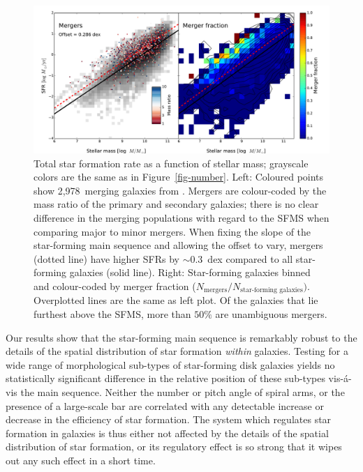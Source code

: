 \documentclass{emulateapj}
\begin{document}
\begin{figure}
\includegraphics[angle=0,width=7.0in]{figures/ms_mergers_both.pdf}
\caption{Total star formation rate as a function of stellar mass; grayscale colors are the same as in Figure~\ref{fig-number}. Left: Coloured points show 2,978~merging galaxies from \citet{dar10a}. Mergers are colour-coded by the mass ratio of the primary and secondary galaxies; there is no clear difference in the merging populations with regard to the SFMS when comparing major to minor mergers. When fixing the slope of the star-forming main sequence and allowing the offset to vary, mergers (dotted line) have higher SFRs by $\sim0.3$~dex compared to all star-forming galaxies (solid line). Right: Star-forming galaxies binned and colour-coded by merger fraction ($N_\textrm{mergers}/N_\textrm{star-forming galaxies})$. Overplotted lines are the same as left plot. Of the galaxies that lie furthest above the SFMS, more than $50\%$ are unambiguous mergers. 
\label{fig-mergers}}
\end{figure}

Our results show that the star-forming main sequence is remarkably robust to the details of the spatial distribution of star formation \textit{within} galaxies. Testing for a wide range of morphological sub-types of star-forming disk galaxies yields no statistically significant difference in the relative position of these sub-types vis-\'a-vis the main sequence. Neither the number or pitch angle of spiral arms, or the presence of a large-scale bar are correlated with any detectable increase or decrease in the efficiency of star formation. The system which regulates star formation in galaxies is thus either not affected by the details of the spatial distribution of star formation, or its regulatory effect is so strong that it wipes out any such effect in a short time. 
\end{document}
